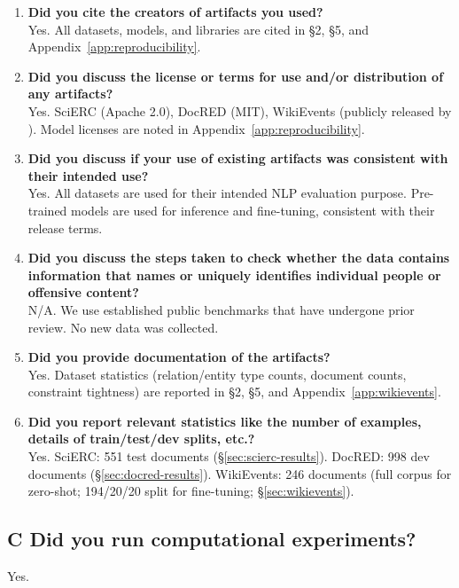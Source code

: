 \begin{enumerate}[label=\textbf{B\arabic*.},leftmargin=2.5em]
\item \textbf{Did you cite the creators of artifacts you used?}
\\ Yes. All datasets, models, and libraries are cited in \S2, \S5, and Appendix~\ref{app:reproducibility}.

\item \textbf{Did you discuss the license or terms for use and/or distribution of any artifacts?}
\\ Yes. SciERC (Apache 2.0), DocRED (MIT), WikiEvents (publicly released by \citet{li2021document}). Model licenses are noted in Appendix~\ref{app:reproducibility}.

\item \textbf{Did you discuss if your use of existing artifacts was consistent with their intended use?}
\\ Yes. All datasets are used for their intended NLP evaluation purpose. Pre-trained models are used for inference and fine-tuning, consistent with their release terms.

\item \textbf{Did you discuss the steps taken to check whether the data contains information that names or uniquely identifies individual people or offensive content?}
\\ N/A. We use established public benchmarks that have undergone prior review. No new data was collected.

\item \textbf{Did you provide documentation of the artifacts?}
\\ Yes. Dataset statistics (relation/entity type counts, document counts, constraint tightness) are reported in \S2, \S5, and Appendix~\ref{app:wikievents}.

\item \textbf{Did you report relevant statistics like the number of examples, details of train/test/dev splits, etc.?}
\\ Yes. SciERC: 551 test documents (\S\ref{sec:scierc-results}). DocRED: 998 dev documents (\S\ref{sec:docred-results}). WikiEvents: 246 documents (full corpus for zero-shot; 194/20/20 split for fine-tuning; \S\ref{sec:wikievents}).
\end{enumerate}

\subsection*{C \hspace{0.5em} Did you run computational experiments?}
Yes.

